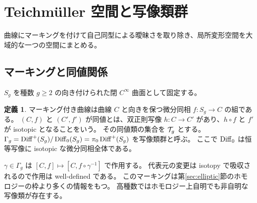 \documentclass[dvipdfmx,a4paper,11pt]{article}
\theoremstyle{definition}
\newtheorem{dfn}[thm]{定義}
\newenvironment{aim}{\begin{tcolorbox}[mybox,colback=green!3,title=この章で考えること,fonttitle=\bfseries]}{\end{tcolorbox}}
\begin{document}
\par\bigskip\Needspace{.70\textheight}
\section{Teichmüller 空間と写像類群}\label{sec:teich}
\begin{aim}
曲線にマーキングを付けて自己同型による曖昧さを取り除き、局所変形空間を大域的な一つの空間にまとめる。
\end{aim}
\subsection{マーキングと同値関係}
$S_g$ を種数 $g\ge2$ の向き付けられた閉 $C^\infty$ 曲面として固定する。
\begin{dfn}
マーキング付き曲線は曲線 $C$ と向きを保つ微分同相 $f:S_g\to C$ の組である。
$(C,f)$ と $(C',f')$ が同値とは、双正則写像 $h:C\to C'$ があり、$h\circ f$ と $f'$ が isotopic となることをいう。
その同値類の集合を $\mathcal T_g$ とする。
$\Gamma_g=\operatorname{Diff}^+(S_g)/\operatorname{Diff}_0(S_g)=\pi_0\operatorname{Diff}^+(S_g)$ を写像類群と呼ぶ。
ここで $\operatorname{Diff}_0$ は恒等写像に isotopic な微分同相全体である。
\end{dfn}
$\gamma\in\Gamma_g$ は $[C,f]\mapsto[C,f\circ\gamma^{-1}]$ で作用する。
代表元の変更は isotopy で吸収されるので作用は well-defined である。
このマーキングは第\ref{sec:elliptic}節のホモロジーの枠より多くの情報をもつ。
高種数ではホモロジー上自明でも非自明な写像類が存在する。
\end{document}
